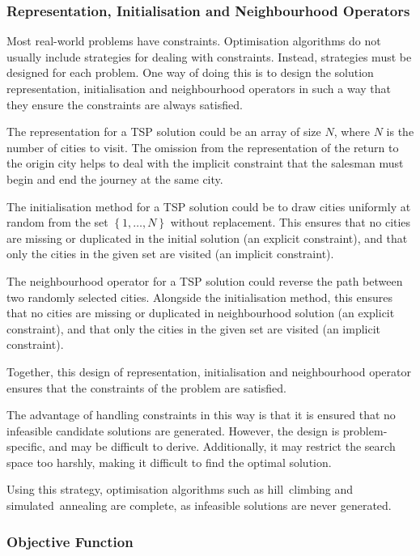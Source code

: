 \subsubsection{Representation, Initialisation and Neighbourhood Operators}

Most real-world problems have constraints.
Optimisation algorithms do not usually include strategies for dealing with constraints.
Instead, strategies must be designed for each problem.
One way of doing this is to design the solution representation, initialisation and neighbourhood operators in such a way that they ensure the constraints are always satisfied.

The representation for a TSP solution could be an array of size \( N \), where \( N \) is the number of cities to visit.
The omission from the representation of the return to the origin city helps to deal with the implicit constraint that the salesman must begin and end the journey at the same city.

The initialisation method for a TSP solution could be to draw cities uniformly at random from the set \( \left\{ 1, \ldots, N \right\} \) without replacement.
This ensures that no cities are missing or duplicated in the initial solution (an explicit constraint), and that only the cities in the given set are visited (an implicit constraint).

The neighbourhood operator for a TSP solution could reverse the path between two randomly selected cities.
Alongside the initialisation method, this ensures that no cities are missing or duplicated in neighbourhood solution (an explicit constraint), and that only the cities in the given set are visited (an implicit constraint).

Together, this design of representation, initialisation and neighbourhood operator ensures that the constraints of the problem are satisfied.

The advantage of handling constraints in this way is that it is ensured that no infeasible candidate solutions are generated.
However, the design is problem-specific, and may be difficult to derive.
Additionally, it may restrict the search space too harshly, making it difficult to find the optimal solution.

Using this strategy, optimisation algorithms such as hill~climbing and simulated~annealing are complete, as infeasible solutions are never generated.

\subsubsection{Objective Function}

